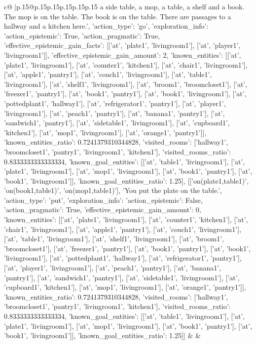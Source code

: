 \documentclass{article}
\begin{document}
{\begin{supertabular}{c@{$\;$}|p{.15\linewidth}@{}p{.15\linewidth}p{.15\linewidth}p{.15\linewidth}p{.15\linewidth}p{.15\linewidth}}
{{{a side table, a mop, a table, a shelf and a book. The mop is on the table. The book is on the table. There are passages to a hallway and a kitchen here.\n', {'action_type': 'go', 'exploration_info': {'action_epistemic': True, 'action_pragmatic': True, 'effective_epistemic_gain_facts': [['at', 'plate1', 'livingroom1'], ['at', 'player1', 'livingroom1']], 'effective_epistemic_gain_amount': 2, 'known_entities': [['at', 'plate1', 'livingroom1'], ['at', 'counter1', 'kitchen1'], ['at', 'chair1', 'livingroom1'], ['at', 'apple1', 'pantry1'], ['at', 'couch1', 'livingroom1'], ['at', 'table1', 'livingroom1'], ['at', 'shelf1', 'livingroom1'], ['at', 'broom1', 'broomcloset1'], ['at', 'freezer1', 'pantry1'], ['at', 'book1', 'pantry1'], ['at', 'book1', 'livingroom1'], ['at', 'pottedplant1', 'hallway1'], ['at', 'refrigerator1', 'pantry1'], ['at', 'player1', 'livingroom1'], ['at', 'peach1', 'pantry1'], ['at', 'banana1', 'pantry1'], ['at', 'sandwich1', 'pantry1'], ['at', 'sidetable1', 'livingroom1'], ['at', 'cupboard1', 'kitchen1'], ['at', 'mop1', 'livingroom1'], ['at', 'orange1', 'pantry1']], 'known_entities_ratio': 0.7241379310344828, 'visited_rooms': ['hallway1', 'broomcloset1', 'pantry1', 'livingroom1', 'kitchen1'], 'visited_rooms_ratio': 0.8333333333333334, 'known_goal_entities': [['at', 'table1', 'livingroom1'], ['at', 'plate1', 'livingroom1'], ['at', 'mop1', 'livingroom1'], ['at', 'book1', 'pantry1'], ['at', 'book1', 'livingroom1']], 'known_goal_entities_ratio': 1.25}}], [['on(plate1,table1)', 'on(book1,table1)', 'on(mop1,table1)'], 'You put the plate on the table.\n', {'action_type': 'put', 'exploration_info': {'action_epistemic': False, 'action_pragmatic': True, 'effective_epistemic_gain_amount': 0, 'known_entities': [['at', 'plate1', 'livingroom1'], ['at', 'counter1', 'kitchen1'], ['at', 'chair1', 'livingroom1'], ['at', 'apple1', 'pantry1'], ['at', 'couch1', 'livingroom1'], ['at', 'table1', 'livingroom1'], ['at', 'shelf1', 'livingroom1'], ['at', 'broom1', 'broomcloset1'], ['at', 'freezer1', 'pantry1'], ['at', 'book1', 'pantry1'], ['at', 'book1', 'livingroom1'], ['at', 'pottedplant1', 'hallway1'], ['at', 'refrigerator1', 'pantry1'], ['at', 'player1', 'livingroom1'], ['at', 'peach1', 'pantry1'], ['at', 'banana1', 'pantry1'], ['at', 'sandwich1', 'pantry1'], ['at', 'sidetable1', 'livingroom1'], ['at', 'cupboard1', 'kitchen1'], ['at', 'mop1', 'livingroom1'], ['at', 'orange1', 'pantry1']], 'known_entities_ratio': 0.7241379310344828, 'visited_rooms': ['hallway1', 'broomcloset1', 'pantry1', 'livingroom1', 'kitchen1'], 'visited_rooms_ratio': 0.8333333333333334, 'known_goal_entities': [['at', 'table1', 'livingroom1'], ['at', 'plate1', 'livingroom1'], ['at', 'mop1', 'livingroom1'], ['at', 'book1', 'pantry1'], ['at', 'book1', 'livingroom1']], 'known_goal_entities_ratio': 1.25}}]]
            }
        }
    }
    & & \\ \\


\end{supertabular}}
\end{document}
